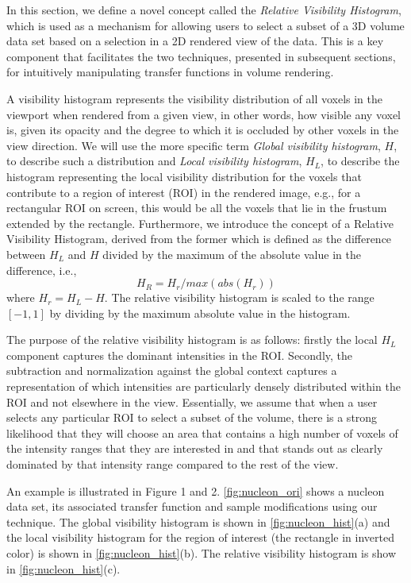 \documentclass[twoside,twocolumn,10pt]{article}
\begin{document}
In this section, we define a novel concept called the \emph{Relative Visibility Histogram}, which is used as a mechanism for allowing users to select a subset of a 3D volume data set based on a selection in a 2D rendered view of the data. This is a key component that facilitates the two techniques, presented in subsequent sections, for intuitively manipulating transfer functions in volume rendering.

A visibility histogram \cite{correa_visibility_2011} represents the visibility distribution of all voxels in the viewport when rendered from a given view, in other words, how visible any voxel is, given its opacity and the degree to which it is occluded by other voxels in the view direction. We will use the more specific term \emph{Global visibility histogram}, $ H $, to describe such a distribution and  \emph{Local visibility histogram}, $ H_{L} $,  to describe the histogram representing the local visibility distribution for the voxels that contribute to a region of interest (ROI) in the rendered image, e.g., for a rectangular ROI on screen, this would be all the voxels that lie in the frustum extended by the rectangle. Furthermore, we introduce the concept of a Relative Visibility Histogram, derived from the former which is defined as the difference between $ H_{L} $ and $ H $ divided by the maximum of the absolute value in the difference, i.e.,
\[
H_{R}=H_{r}/max(abs(H_{r}))
\]
where $ H_{r}=H_{L}-H$.
The relative visibility histogram is scaled to the range $ [-1,1] $ by dividing by the maximum absolute value in the histogram. 

The purpose of the relative visibility histogram is as follows: firstly the local $ H_L $ component captures the dominant intensities in the ROI. Secondly, the subtraction and normalization against the global context captures a representation of which intensities are particularly densely distributed within the ROI and not elsewhere in the view. Essentially, we assume that when a user selects any particular ROI to select a subset of the volume, there is a strong likelihood that they will choose an area that contains a high number of voxels of the intensity ranges that they are interested in and that stands out as clearly dominated by that intensity range compared to the rest of the view. 


An example is illustrated in Figure 1 and 2.
\autoref{fig:nucleon_ori} shows a nucleon data set, its associated transfer function and sample modifications using our technique.
The global visibility histogram is shown in 
\autoref{fig:nucleon_hist}(a) and the local visibility histogram for the region of interest (the rectangle in inverted color) is shown in \autoref{fig:nucleon_hist}(b). The relative visibility histogram
is show in \autoref{fig:nucleon_hist}(c).
\end{document}

